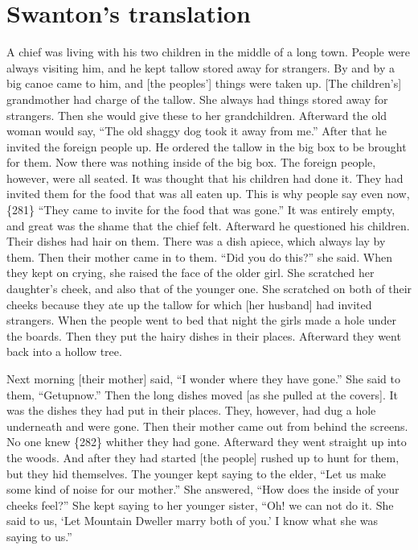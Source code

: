 \section{Swanton’s translation}\label{sec:92-swanton-translation}

A chief was living with his two children in the middle of a long town.
People were always visiting him, and he kept tallow stored away for strangers.
By and by a big canoe came to him, and [the peoples’] things were taken up.
{}[The children’s] grandmother had charge of the tallow.
She always had things stored away for strangers.
Then she would give these to her grandchildren.
Afterward the old woman would say,
“The old shaggy dog took it away from me.”
After that he invited the foreign people up.
He ordered the tallow in the big box to be brought for them.
Now there was nothing inside of the big box.
The foreign people, however, were all seated.
It was thought that his children had done it.
They had invited them for the food that was all eaten up.
This is why people say even now,
\{281\} “They came to invite for the food that was gone.”
It was entirely empty, and great was the shame that the chief felt.
Afterward he questioned his children.
Their dishes had hair on them.
There was a dish apiece, which always lay by them.
Then their mother came in to them.
“Did you do this?”
she said.
When they kept on crying, she raised the face of the older girl.
She scratched her daughter’s cheek, and also that of the younger one.
She scratched on both of their cheeks because they ate up the tallow for which [her husband] had invited strangers.
When the people went to bed that night the girls made a hole under the boards.
Then they put the hairy dishes in their places.
Afterward they went back into a hollow tree.

Next morning [their mother] said,
“I wonder where they have gone.”
She said to them,
“Getupnow.”
Then the long dishes moved [as she pulled at the covers].
It was the dishes they had put in their places.
They, however, had dug a hole underneath and were gone.
Then their mother came out from behind the screens.
No one knew \{282\} whither they had gone.
Afterward they went straight up into the woods.
And after they had started [the people] rushed up to hunt for them, but they hid themselves.
The younger kept saying to the elder,
“Let us make some kind of noise for our mother.”
She answered,
“How does the inside of your cheeks feel?”
She kept saying to her younger sister,
“Oh! we can not do it.
She said to us,
‘Let Mountain Dweller marry both of you.’
I know what she was saying to us.”

